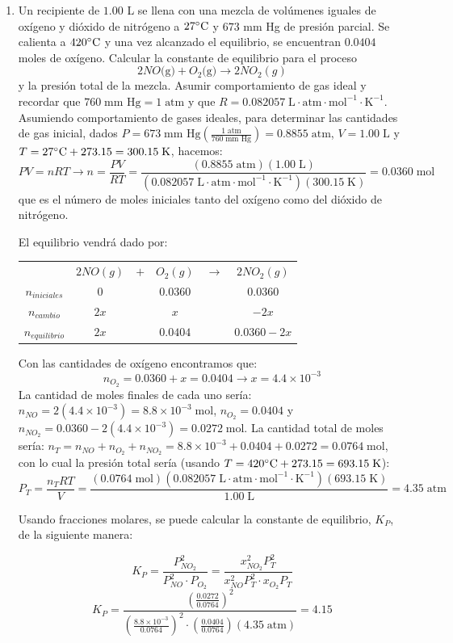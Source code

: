 \documentclass[a4paper,12pt]{article}
\begin{document}
\begin{enumerate}
 \item Un recipiente de $1.00$ L se llena con una mezcla de vol\'umenes iguales de ox\'igeno y di\'oxido de nitr\'ogeno a $27\celsius$ y $673$ mm Hg de presi\'on parcial. Se calienta a $420\celsius$ y una vez alcanzado el equilibrio, se encuentran $0.0404$ moles de ox\'igeno. Calcular la constante de equilibrio para el proceso
$$2NO\mbox{(g)}+O_2\mbox{(g)}\rightarrow 2NO_2{(g)}$$
y la presi\'on total de la mezcla. Asumir comportamiento de gas ideal y recordar que $760\;\mbox{mm Hg}=1\;\mbox{atm}$ y que $R=0.082057\;\text{L}\cdot\text{atm}\cdot\text{mol}^{-1}\cdot\text{K}^{-1}$. \\

Asumiendo comportamiento de gases ideales, para determinar las cantidades de gas inicial, dados $P=673\;\mbox{mm Hg}\left(\frac{1\;\mbox{atm}}{760\;\mbox{mm Hg}}\right)=0.8855\;\mbox{atm}$, $V=1.00\;\mbox{L}$ y $T=27\celsius+273.15=300.15\;\mbox{K}$, hacemos:
$$PV=nRT\rightarrow n=\frac{PV}{RT}=\frac{(0.8855\;\mbox{atm})(1.00\;\mbox{L})}{(0.082057\;\text{L}\cdot\text{atm}\cdot\text{mol}^{-1}\cdot\text{K}^{-1})(300.15\;\mbox{K})}=0.0360\;\mbox{mol}$$
que es el n\'umero de moles iniciales tanto del ox\'igeno como del di\'oxido de nitr\'ogeno.

El equilibrio vendr\'a dado por:

\begin{center}
\begin{tabular}{c c c c c c}
& $2NO(g)$ & $+$ & $O_2(g)$ & $\rightarrow$ & $2NO_2(g)$ \\
$n_{iniciales}$ & 0 & & 0.0360 & & 0.0360 \\
$n_{cambio}$ & $2x$ & & $x$ & & $-2x$ \\
$n_{equilibrio}$ & $2x$ & & $0.0404$ & & $0.0360-2x$
\end{tabular}
\end{center}

Con las cantidades de ox\'igeno encontramos que: 
$$n_{O_2}=0.0360+x=0.0404\rightarrow x=4.4\times 10^{-3}$$
La cantidad de moles finales de cada uno ser\'ia: $n_{NO}=2(4.4\times 10^{-3})=8.8\times 10^{-3}\;\mbox{mol}$, $n_{O_2}=0.0404$ y $n_{NO_2}=0.0360-2(4.4\times 10^{-3})=0.0272\;\mbox{mol}$. La cantidad total de moles ser\'ia: $n_T=n_{NO}+n_{O_2}+n_{NO_2}=8.8\times 10^{-3}+0.0404+0.0272=0.0764\;\mbox{mol}$, con lo cual la presi\'on total ser\'ia (usando $T=420\celsius+273.15=693.15\;\mbox{K}$):
$$P_T=\frac{n_TRT}{V}=\frac{(0.0764\;\mbox{mol})(0.082057\;\text{L}\cdot\text{atm}\cdot\text{mol}^{-1}\cdot\text{K}^{-1})(693.15\;\mbox{K})}{1.00\;\mbox{L}}=4.35\;\mbox{atm}$$

Usando fracciones molares, se puede calcular la constante de equilibrio, $K_P$, de la siguiente manera:

$$K_P=\frac{P_{NO_2}^2}{P_{NO}^2\cdot P_{O_2}}=\frac{x_{NO_2}^2P_T^2}{x_{NO}^2P_T^2\cdot x_{O_2}P_T}$$
$$K_P = \frac{\left(\frac{0.0272}{0.0764}\right)^2}{\left(\frac{8.8\times 10^{-3}}{0.0764}\right)^2\cdot\left(\frac{0.0404}{0.0764}\right)(4.35\;\mbox{atm})}=4.15$$

\end{enumerate}
 
\end{document}
